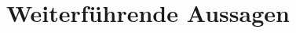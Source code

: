 \documentclass[ngerman
  ,numbers=noenddot %
  ,headsepline
  ,parskip=half*
  ,openany
  ,DIV=15
]{scrbook}
\numberwithin{equation}{chapter}
\numberwithin{figure}{chapter}
\theoremstyle{plain}%
\theoremstyle{definition}
\theoremstyle{remark}
\begin{document}

\frontmatter



\tableofcontents{}
\newpage



\mainmatter


\newpage


\newpage

\chapter{Weiterführende Aussagen}

\newpage

\appendix
{}



\nocite{*}
% 


\end{document}
